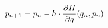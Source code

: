 \documentclass[preview]{standalone}
\begin{document}
\begin{align*}
\special{dvisvgm:raw <g id='unique000'>}p_{n+1} = p_n - h \cdot \frac{\partial H}{\partial q}(q_n, p_n)\special{dvisvgm:raw </g>}
\end{align*}
\end{document}
